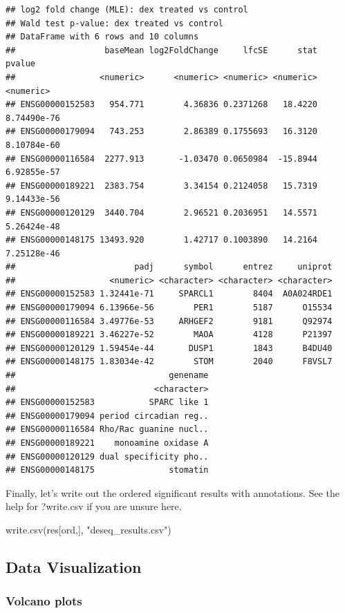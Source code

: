 \documentclass[
]{article}
\newenvironment{Shaded}{\begin{snugshade}}{\end{snugshade}}
\newcommand{\FunctionTok}[1]{\textcolor[rgb]{0.00,0.00,0.00}{#1}}
\newcommand{\NormalTok}[1]{#1}
\newcommand{\StringTok}[1]{\textcolor[rgb]{0.31,0.60,0.02}{#1}}
\begin{document}
\begin{verbatim}
## log2 fold change (MLE): dex treated vs control 
## Wald test p-value: dex treated vs control 
## DataFrame with 6 rows and 10 columns
##                  baseMean log2FoldChange     lfcSE      stat      pvalue
##                 <numeric>      <numeric> <numeric> <numeric>   <numeric>
## ENSG00000152583   954.771        4.36836 0.2371268   18.4220 8.74490e-76
## ENSG00000179094   743.253        2.86389 0.1755693   16.3120 8.10784e-60
## ENSG00000116584  2277.913       -1.03470 0.0650984  -15.8944 6.92855e-57
## ENSG00000189221  2383.754        3.34154 0.2124058   15.7319 9.14433e-56
## ENSG00000120129  3440.704        2.96521 0.2036951   14.5571 5.26424e-48
## ENSG00000148175 13493.920        1.42717 0.1003890   14.2164 7.25128e-46
##                        padj      symbol      entrez     uniprot
##                   <numeric> <character> <character> <character>
## ENSG00000152583 1.32441e-71     SPARCL1        8404  A0A024RDE1
## ENSG00000179094 6.13966e-56        PER1        5187      O15534
## ENSG00000116584 3.49776e-53     ARHGEF2        9181      Q92974
## ENSG00000189221 3.46227e-52        MAOA        4128      P21397
## ENSG00000120129 1.59454e-44       DUSP1        1843      B4DU40
## ENSG00000148175 1.83034e-42        STOM        2040      F8VSL7
##                               genename
##                            <character>
## ENSG00000152583           SPARC like 1
## ENSG00000179094 period circadian reg..
## ENSG00000116584 Rho/Rac guanine nucl..
## ENSG00000189221    monoamine oxidase A
## ENSG00000120129 dual specificity pho..
## ENSG00000148175               stomatin
\end{verbatim}

Finally, let's write out the ordered significant results with
annotations. See the help for ?write.csv if you are unsure here.

\begin{Shaded}
\begin{Highlighting}[]
\FunctionTok{write.csv}\NormalTok{(res[ord,], }\StringTok{"deseq\_results.csv"}\NormalTok{)}
\end{Highlighting}
\end{Shaded}

\hypertarget{data-visualization}{%
\subsection{Data Visualization}\label{data-visualization}}

\hypertarget{volcano-plots}{%
\subsubsection{Volcano plots}\label{volcano-plots}}
\end{document}

